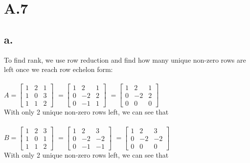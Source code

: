 \documentclass{article}
\newcommand{\1}{\mathbf{1}}
\begin{document}
\section*{A.7}
{\Large 

\subsection*{a.}
To find rank, we use row reduction and find how many unique non-zero rows are left once we reach row echelon form: \\ \\
$A = \begin{bmatrix} 1 & 2 & 1 \\ 1 & 0 & 3 \\ 1 & 1 & 2 \end{bmatrix}$ 
$ = \begin{bmatrix} 1 & 2 & 1 \\ 0 & -2 & 2 \\ 0 & -1 & 1 \end{bmatrix}$
$ = \begin{bmatrix} 1 & 2 & 1 \\ 0 & -2 & 2 \\ 0 & 0 & 0 \end{bmatrix}$ \\
With only 2 unique non-zero rows left, we can see that  \\ \\
$B = \begin{bmatrix} 1 & 2 & 3 \\ 1 & 0 & 1 \\ 1 & 1 & 2 \end{bmatrix}$ 
$ = \begin{bmatrix} 1 & 2 & 3 \\ 0 & -2 & -2 \\ 0 & -1 & -1 \end{bmatrix}$
$ = \begin{bmatrix} 1 & 2 & 3 \\ 0 & -2 & -2 \\ 0 & 0 & 0 \end{bmatrix}$ \\ 
With only 2 unique non-zero rows left, we can see that 

}
\end{document}
